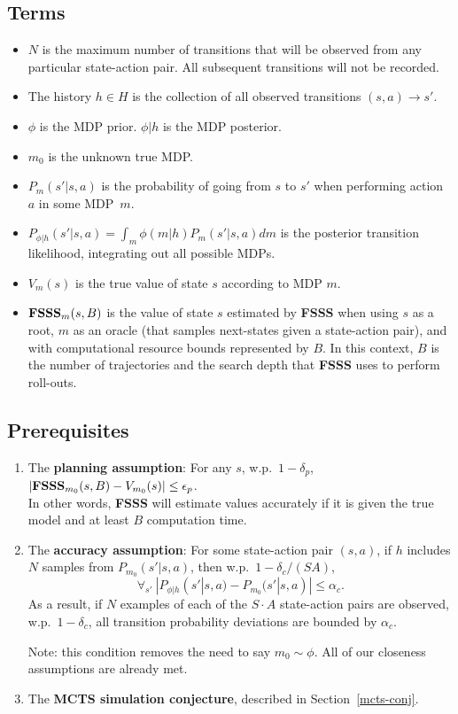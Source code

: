 \subsection{Terms}
\begin{itemize}
\item $N$ is the maximum number of transitions that will be observed from any particular state-action pair. All subsequent transitions will not be recorded.
\item The history $h\in H$ is the collection of all observed transitions $(s,a)\rightarrow s'$.
\item $\phi$ is the MDP prior. $\phi|h$ is the MDP posterior.
\item $m_0$ is the unknown true MDP.
\item $P_m(s'|s,a)$ is the probability of going from $s$ to $s'$ when performing action $a$ in some MDP~$m$.
\item $P_{\phi|h}(s'|s,a)=\int_m \phi(m|h)P_m(s'|s,a) dm$ is the posterior transition likelihood, integrating out all possible MDPs.
\item $V_m(s)$ is the true value of state $s$ according to MDP $m$.
\item $\mbox{\bf FSSS}_m(s, B)$ is the value of state $s$ estimated by {\bf FSSS} when using $s$ as a root, $m$ as an oracle (that samples next-states given a state-action pair), and with computational resource bounds represented by $B$. In this context, $B$ is the number of trajectories and the search depth that {\bf FSSS} uses to perform roll-outs.
\end{itemize}

\subsection{Prerequisites}
\begin{enumerate}
\item \label{fsss-acc} The {\bf planning assumption}: For any $s$, w.p.\ $1-\delta_p$, $|\mbox{\bf FSSS}_{m_0}(s, B)-V_{m_0}(s)| \leq \epsilon_p$.\\
In other words, {\bf FSSS} will estimate values accurately if it is given the true model and at least $B$ computation time. 
\item \label{sa-bound} The {\bf accuracy assumption}: For some state-action pair $(s,a)$, if $h$ includes $N$ samples from $P_{m_0}(s'|s,a)$, then w.p.\ $1-\delta_c/(S A)$,
$$\forall_{s'}~|P_{\phi|h}(s'|s,a) - P_{m_0}(s'|s,a)| \leq \alpha_c.$$
As a result, if $N$ examples of each of the $S\cdot A$ state-action pairs are observed, w.p.\ $1-\delta_c$, all transition probability deviations are bounded by $\alpha_c$.

Note: this condition removes the need to say $m_0 \sim \phi$. All of our closeness assumptions are already met.
\item The {\bf MCTS simulation conjecture}, described in Section~\ref{mcts-conj}.
\end{enumerate}



